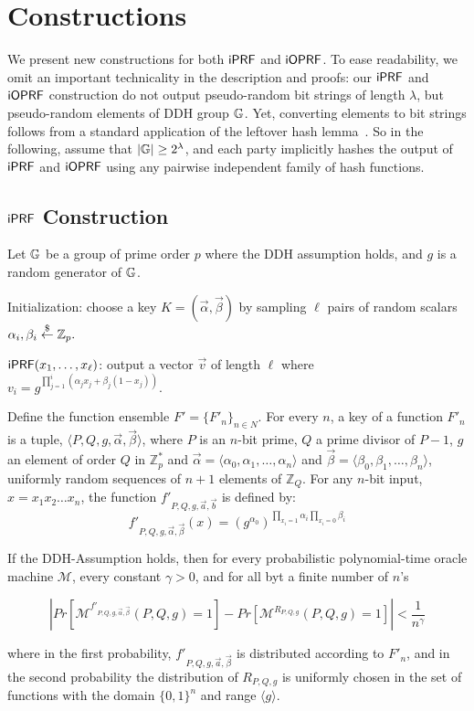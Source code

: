 \section{Constructions}
We present new constructions for both $\mathsf{i}\mathsf{PRF}$ and $\mathsf{i}\mathsf{OPRF}$.  To ease
readability, we omit an important technicality in the description and
proofs: our $\mathsf{i}\mathsf{PRF}$ and $\mathsf{i}\mathsf{OPRF}$ construction do not output
pseudo-random bit strings of length $\lambda$, but pseudo-random
elements of DDH group $\mathbb{G}$. Yet, converting elements to bit strings
follows from a standard application of the leftover hash
lemma~\cite{leftover}. So in the following, assume that
$|\mathbb{G}|\ge{}2^\lambda$, and each party implicitly hashes the output of
$\mathsf{i}\mathsf{PRF}$ and $\mathsf{i}\mathsf{OPRF}$ using any pairwise independent family of hash
functions.



\subsection{$\mathsf{i}\mathsf{PRF}$ Construction}
Let $\mathbb{G}$ be a group of prime order $p$ where the DDH assumption holds,
and $g$ is a random generator of $\mathbb{G}$.

Initialization: choose a key $K=(\vec{{\alpha}},\vec{\beta})$ by sampling
$\ell$ pairs of random scalars
${\alpha_{i}},{\beta_{i}}\stackrel{\$}{\leftarrow}\mathbb{Z}_p.$

$\mathsf{i}\mathsf{PRF}(x_1,\ldots,x_\ell)$: output a vector $\vec{v}$ of length $\ell$ where $v_i = g^{\prod_{j=1}^{i} (\alpha_jx_j+\beta_j(1-x_j))}.$


\begin{construction}
\label{const:newprf}
Define the function ensemble $F' = \{F'_n\}_{n\in N}$.  For every $n$, a key of a function $F'_n$ is a tuple, $\langle P,Q,g,\vec{\alpha},\vec{\beta}\rangle$, 
where $P$ is an $n$-bit prime, $Q$ a prime divisor of $P-1$, $g$ an element of order $Q$ in $\mathbb{Z}_{p}^*$ and $\vec{\alpha}=\langle 
\alpha_0,\alpha_1, \ldots , \alpha_n \rangle$ and $\vec{\beta}=\langle 
\beta_0,\beta_1, \ldots ,\beta_n \rangle$, uniformly random sequences of $n+1$ elements of $\mathbb{Z}_Q$.  For any $n$-bit input, $x=x_1 x_2 \ldots x_n$, the 
function $f'_{P,Q,g,\vec{a},\vec{b}}$ is defined by:
 $$f'_{P,Q,g,\vec{\alpha},\vec{\beta}}(x) = (g^{\alpha_0})^{\prod_{x_i=1}\alpha_i \prod_{x_i=0}\beta_i}$$
 \end{construction}
 
\begin{theorem}
\label{theorem:newprf}

If the DDH-Assumption holds, then for every probabilistic polynomial-time oracle machine $\mathcal{M}$, every constant $\gamma > 0$, and for all byt a finite number of $n$'s

$$| Pr[\mathcal{M}^{f'_{P,Q,g,\vec{\alpha},\vec{\beta}}}(P,Q,g)=1] - Pr[\mathcal{M}^{R_{P,Q,g}}(P,Q,g) = 1]| < \frac{1}{n^\gamma} $$

where in the first probability, $f'_{P,Q,g,\vec{a},\vec{\beta}}$ is distributed according to $F'_n$, and in the second probability the distribution of $R_{P,Q,g}$ is uniformly chosen in the set of functions with the domain $\{0,1\}^n$ and range $\langle g\rangle$.
\end{theorem}

